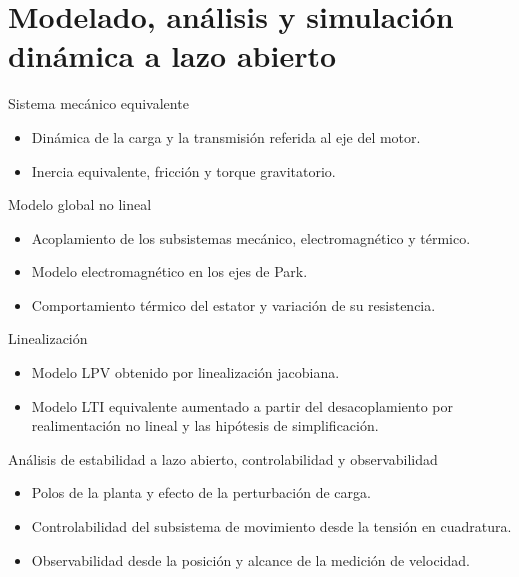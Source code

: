 \documentclass{beamer}
\begin{document}
\section[Modelado a lazo abierto]{Modelado, análisis y simulación dinámica a lazo abierto}

\begin{frame}{Sistema mecánico equivalente}
  \begin{itemize}
    \item Dinámica de la carga y la transmisión referida al eje del motor.
    \item Inercia equivalente, fricción y torque gravitatorio.
  \end{itemize}
\end{frame}

\begin{frame}{Modelo global no lineal}
  \begin{itemize}
    \item Acoplamiento de los subsistemas mecánico, electromagnético y térmico.
    \item Modelo electromagnético en los ejes de Park.
    \item Comportamiento térmico del estator y variación de su resistencia.
  \end{itemize}
\end{frame}

\begin{frame}{Linealización}
  \begin{itemize}
    \item Modelo LPV obtenido por linealización jacobiana.
    \item Modelo LTI equivalente aumentado a partir del desacoplamiento por realimentación no lineal y las hipótesis de simplificación.
  \end{itemize}
\end{frame}

\begin{frame}{Análisis de estabilidad a lazo abierto, controlabilidad y observabilidad}
  \begin{itemize}
    \item Polos de la planta y efecto de la perturbación de carga.
    \item Controlabilidad del subsistema de movimiento desde la tensión en cuadratura.
    \item Observabilidad desde la posición y alcance de la medición de velocidad.
  \end{itemize}
\end{frame}
\end{document}
